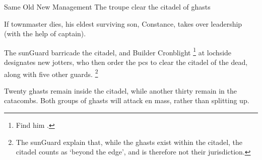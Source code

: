 {Same Old New Management}%
{The troupe clear the citadel of ghasts}%

If \gls{townmaster} dies, his eldest surviving son, Constance, takes over leadership (with the help of \gls{captain}).

The \gls{sunGuard} barricade the citadel, and Builder Cronblight%
\footnote{Find him .}
at \gls{lochside} designates new \glspl{jotter}, who then order the \glspl{pc} to clear the citadel of the dead, along with five other \glspl{guard}.%
\footnote{The \gls{sunGuard} explain that, while the ghasts exist within the citadel, the citadel counts as `beyond the \gls{edge}', and is therefore not their jurisdiction.}

Twenty ghasts remain inside the citadel, while another thirty remain in the catacombs.
Both groups of ghasts will attack en mass, rather than splitting up.

